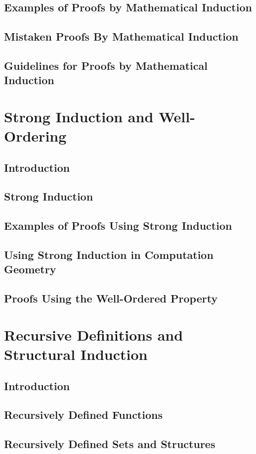 \documentclass[11pt]{book}
\begin{document}
  \subsection{Examples of Proofs by Mathematical Induction}
  \subsection{Mistaken Proofs By Mathematical Induction}
  \subsection{Guidelines for Proofs by Mathematical Induction}
  
 \section{Strong Induction and Well-Ordering}
  \subsection{Introduction}
  \subsection{Strong Induction}
  \subsection{Examples of Proofs Using Strong Induction}
  \subsection{Using Strong Induction in Computation Geometry}
  \subsection{Proofs Using the Well-Ordered Property}
  
 \section{Recursive Definitions and Structural Induction}
  \subsection{Introduction}
  \subsection{Recursively Defined Functions}
  \subsection{Recursively Defined Sets and Structures}
\end{document}
